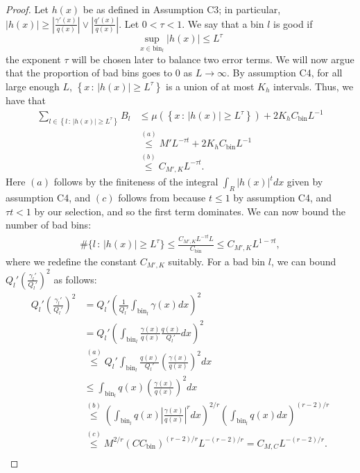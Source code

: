 \documentclass{article}
\newcommand{\bin}{\text{bin}}
\begin{document}
\begin{proof}
Let $h(x)$ be as defined in Assumption C3; in particular, $|h(x)| \geq 
\left| \frac{\gamma'(x)}{q(x)} \right| \vee \left| \frac{q'(x)}{q(x)} \right|$.  Let $0 < \tau < 1$. We say that a bin $l$ is good if
$$
\sup_{x \in \bin_l} |h(x)| \leq L^\tau
$$
the exponent $\tau$ will be chosen later to balance two error terms. We will now argue that the proportion of bad bins goes to 0 as $L \rightarrow \infty$. By assumption C4, for all large enough $L$, $\left \{x \,:\, |h(x)|  \geq L^\tau \right \}$ is a union of at most $K_h$ intervals. Thus, we have that
\begin{align*}
\sum_{l \in \left \{ l \,:\, |h(x)| 
           \geq L^\tau \right \}}  B_l &\leq 
   \mu \left( \left\{x \,:\, |h(x)|
         \geq L^\tau \right\} \right) + 2 K_h C_\bin L^{-1} \\
  &\stackrel{(a)}\leq M' L^{-\tau t}  + 2K_h C_\bin L^{-1} \\
  & \stackrel{(b)}\leq C_{M', K} L^{ - \tau t}.
\end{align*}
Here $(a)$ follows by the finiteness of the integral $\int_R |h(x)|^t dx$ given by assumption C4, and $(c)$ follows from because $t \leq 1$ by assumption C4, and $\tau t < 1$ by our selection, and so the first term dominates. 
We can now bound the number of bad bins: 
\begin{align*}
\# \{ l \,:\, |h(x)| \geq L^\tau \} \leq \frac{C_{M', K} L^{- \tau t} L}{C_\bin}  \leq C_{M',K} L^{1 - \tau t},
\end{align*}
where we redefine the constant $C_{M',K}$ suitably. For a bad bin $l$, we can bound $Q_l' \left( \frac{\gamma_l'}{Q_l'} \right)^2$ as follows:
\begin{align*}
Q_l' \left( \frac{\gamma_l'}{Q_l'} \right)^2 &= Q_l' \left( \frac{1}{Q_l'} \int_{\bin_l} \gamma(x) dx \right)^2 \\
   &= Q_l' \left(  \int_{\bin_l} \frac{\gamma(x)}{q(x)} \frac{q(x)}{Q_l'} dx \right)^2 \\
   &\stackrel{(a)} \leq Q_l' \int_{\bin_l} \frac{q(x)}{Q_l'} \left( \frac{\gamma(x)}{q(x)} \right)^2 dx\\
   &\leq \int_{\bin_l} q(x) \left( \frac{\gamma(x)}{q(x)} \right)^2 dx \\
   &\stackrel{(b)}\leq \left(\int_{\bin_l} q(x) \left| \frac{\gamma(x)}{q(x)} \right|^r dx \right)^{2/r}
         \left(\int_{\bin_l} q(x) dx \right)^{(r-2)/r} \\
   &\stackrel{(c)} \leq M^{2/r} (C C_\bin)^{(r-2)/r} L^{-(r-2)/r} = C_{M,C} L^{-(r-2)/r}.\\

\end{align*}
\end{proof}
\end{document}

